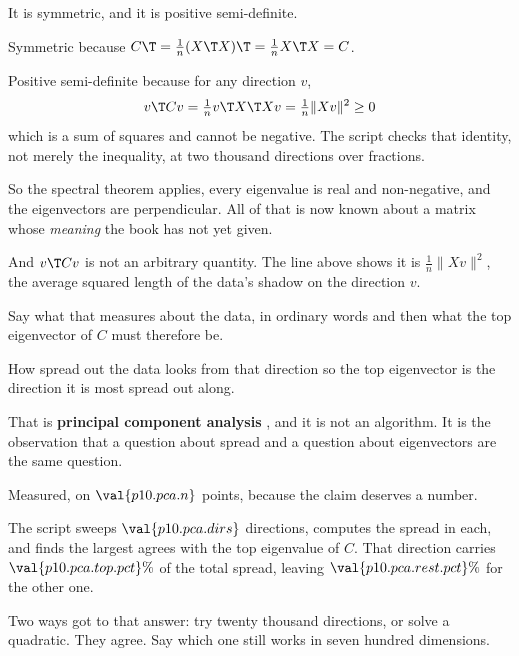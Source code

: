 \begin{fr}
\begin{ansblock}
It is symmetric, and it is positive semi-definite.
\end{ansblock}

Symmetric because $C\T = \frac{1}{n}(X\T X)\T = \frac{1}{n}X\T X = C$.

Positive semi-definite because for any direction $v$,
\[ v\T C v = \tfrac{1}{n}v\T X\T X v = \tfrac{1}{n}\lVert Xv \rVert^{2} \ge 0 \]
which is a sum of squares and cannot be negative. The script checks that
identity, not merely the inequality, at two thousand directions over fractions.

So the spectral theorem applies, every eigenvalue is real and non-negative, and
the eigenvectors are perpendicular. All of that is now known about a matrix
whose \emph{meaning} the book has not yet given.
\end{fr}

\begin{fr}
And $v\T Cv$ is not an arbitrary quantity. The line above shows it is
$\frac{1}{n}\lVert Xv \rVert^{2}$, the average squared length of the data's
shadow on the direction $v$.

Say what that measures about the data, in ordinary words \dash{} and then what
the top eigenvector of $C$ must therefore be.
\dotline
\nextframe
\end{fr}

\begin{fr}
\begin{ansblock}
How spread out the data looks from that direction \dash{} so the top
eigenvector is the direction it is most spread out along.
\end{ansblock}

That is \textbf{principal component
analysis}%
, and it is not an algorithm. It
is the observation that a question about spread and a question about
eigenvectors are the same question.

Measured, on $\val{p10.pca.n}$ points, because the claim deserves a number.

The script sweeps $\val{p10.pca.dirs}$ directions, computes the spread in each,
and finds the largest agrees with the top eigenvalue of $C$. That direction
carries $\val{p10.pca.top.pct}\%$ of the total spread, leaving
$\val{p10.pca.rest.pct}\%$ for the other one.

Two ways got to that answer: try twenty thousand directions, or solve a
quadratic. They agree. Say which one still works in seven hundred dimensions.
\dotline
\nextframe
\end{fr}

